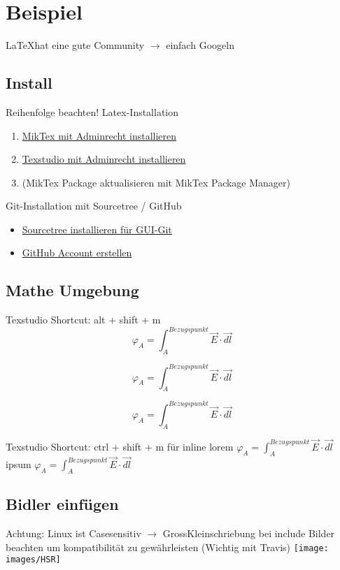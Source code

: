 \section{Beispiel}
\LaTeX  hat eine gute Community $\rightarrow$ einfach Googeln\newline
\subsection{Install}
Reihenfolge beachten!\newline
Latex-Installation\newline
\begin{enumerate}
    \item \href{https://miktex.org/download}{MikTex mit Adminrecht installieren}
    \item \href{https://www.texstudio.org}{Texstudio mit Adminrecht installieren}
    \item (MikTex Package aktualisieren mit MikTex Package Manager)
\end{enumerate}

Git-Installation mit Sourcetree / GitHub\newline
\begin{itemize}
    \item \href{https://www.sourcetreeapp.com/}{Sourcetree installieren für GUI-Git}\item \href{https://www.github.com/}{GitHub Account erstellen}
\end{itemize}
\subsection{Mathe Umgebung}
Texstudio Shortcut: alt + shift + m
\[ \varphi_A = \int_{A}^{Bezugspunkt}\vec{E}\cdot\vec{dl} \]

\begin{equation*}
\varphi_A = \int_{A}^{Bezugspunkt}\vec{E}\cdot\vec{dl}
\end{equation*}


\begin{equation}
    \varphi_A = \int_{A}^{Bezugspunkt}\vec{E}\cdot\vec{dl}
\end{equation}

Texstudio Shortcut: ctrl + shift + m für inline \newline
lorem $ \varphi_A = \int_{A}^{Bezugspunkt}\vec{E}\cdot\vec{dl}$ ipsum $ \varphi_A = \int_{A}^{Bezugspunkt}\vec{E}\cdot\vec{dl}$

\subsection{Bidler einfügen}
Achtung: Linux ist Casesensitiv $\rightarrow$ GrossKleinschriebung bei include Bilder beachten um kompatibilität zu gewährleisten (Wichtig mit Travis)\newline
\texttt{[image: images/HSR]}

